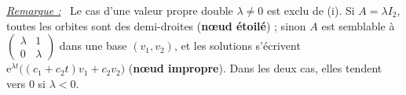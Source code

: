 \documentclass[a4paper,twoside]{report}
\newcommand{\mot}[1]{\textcolor{rougecours}{\textbf{#1}}}
\newenvironment{remarque}%
 {\par\needspace{6\baselineskip}\vspace{1mm}\begin{list}{}{\leftmargin=1cm \rightmargin=0.5cm}\item[]%
  \textit{\underline{Remarque :}}~}%
 {\end{list}\vspace{1mm}}
\newcommand{\ee}{\mathrm{e}}                      %
\begin{document}
\begin{remarque}
Le cas d'une valeur propre double $\lambda \neq 0$ est exclu de (i). Si $A = \lambda I_{2}$, toutes les orbites sont des demi-droites (\mot{nœud étoilé}) ; sinon $A$ est semblable à $\begin{pmatrix} \lambda & 1 \\ 0 & \lambda \end{pmatrix}$ dans une base $(v_{1}, v_{2})$, et les solutions s'écrivent $\ee^{\lambda t}\big((c_{1} + c_{2}t)v_{1} + c_{2}v_{2}\big)$ (\mot{nœud impropre}). Dans les deux cas, elles tendent vers $0$ si $\lambda < 0$.
\end{remarque}

\end{document}
